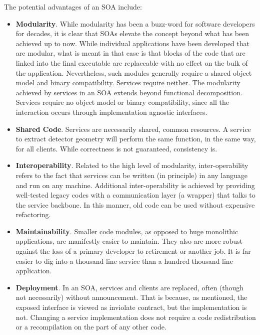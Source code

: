 The potential advantages of an SOA include:

\begin{itemize}

\item
{\bf Modularity}. While modularity has been a buzz-word for software 
developers for decades, it is clear that SOAs elevate the concept beyond 
what has been achieved up to now.  While individual applications have been 
developed that are modular, what is meant in that case is that blocks of 
the code that are linked into the final executable are replaceable with 
no effect on the bulk of the application.  Nevertheless, such modules 
generally require a shared object model and binary compatibility.  Services 
require neither.  The modularity achieved by services in an SOA extends 
beyond functional decomposition. Services require no object model or binary 
compatibility, since all the interaction occurs through implementation 
agnostic interfaces.

\item
{\bf Shared Code}. Services are necessarily shared, common resources. A 
service to extract detector geometry will perform the same function, in the 
same way, for all clients. While correctness is not guaranteed, consistency 
is. 

\item
{\bf Interoperability}. Related to the high level of modularity, 
inter-operability refers to the fact that services can be written (in 
principle) in any language and run on any machine. Additional 
inter-operability is achieved by providing well-tested legacy codes with 
a communication layer (a wrapper) that talks to the service backbone. In 
this manner, old code can be used without expensive refactoring.

\item
{\bf Maintainability}. Smaller code modules, as opposed to huge monolithic 
applications, are manifestly easier to maintain. They also are more robust 
against the loss of a primary developer to retirement or another job. It is 
far easier to dig into a thousand line service than a hundred thousand line 
application.

\item
{\bf Deployment}. In an SOA, services and clients are replaced, often (though 
not necessarily) without announcement.  That is because, as mentioned, the 
exposed interface is viewed as inviolate contract, but the implementation 
is not. Changing a service implementation does not require a code 
redistribution or a recompilation on the part of any other code.


\end{itemize}
